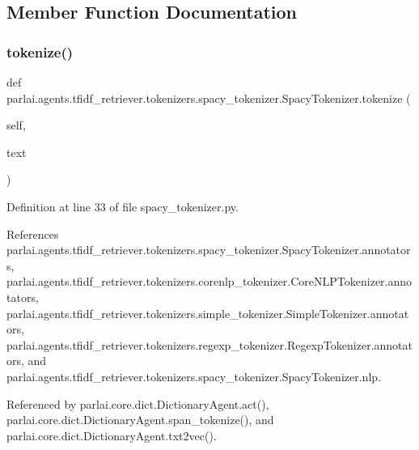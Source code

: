 \subsection{Member Function Documentation}
\mbox{\label{classparlai_1_1agents_1_1tfidf__retriever_1_1tokenizers_1_1spacy__tokenizer_1_1SpacyTokenizer_a479b83909bafee8db3f60c9d8fe69635}} 
\subsubsection{\texorpdfstring{tokenize()}{tokenize()}}
{\footnotesize\ttfamily def parlai.\+agents.\+tfidf\+\_\+retriever.\+tokenizers.\+spacy\+\_\+tokenizer.\+Spacy\+Tokenizer.\+tokenize (\begin{DoxyParamCaption}\item[{}]{self,  }\item[{}]{text }\end{DoxyParamCaption})}



Definition at line 33 of file spacy\+\_\+tokenizer.\+py.



References parlai.\+agents.\+tfidf\+\_\+retriever.\+tokenizers.\+spacy\+\_\+tokenizer.\+Spacy\+Tokenizer.\+annotators, parlai.\+agents.\+tfidf\+\_\+retriever.\+tokenizers.\+corenlp\+\_\+tokenizer.\+Core\+N\+L\+P\+Tokenizer.\+annotators, parlai.\+agents.\+tfidf\+\_\+retriever.\+tokenizers.\+simple\+\_\+tokenizer.\+Simple\+Tokenizer.\+annotators, parlai.\+agents.\+tfidf\+\_\+retriever.\+tokenizers.\+regexp\+\_\+tokenizer.\+Regexp\+Tokenizer.\+annotators, and parlai.\+agents.\+tfidf\+\_\+retriever.\+tokenizers.\+spacy\+\_\+tokenizer.\+Spacy\+Tokenizer.\+nlp.



Referenced by parlai.\+core.\+dict.\+Dictionary\+Agent.\+act(), parlai.\+core.\+dict.\+Dictionary\+Agent.\+span\+\_\+tokenize(), and parlai.\+core.\+dict.\+Dictionary\+Agent.\+txt2vec().

